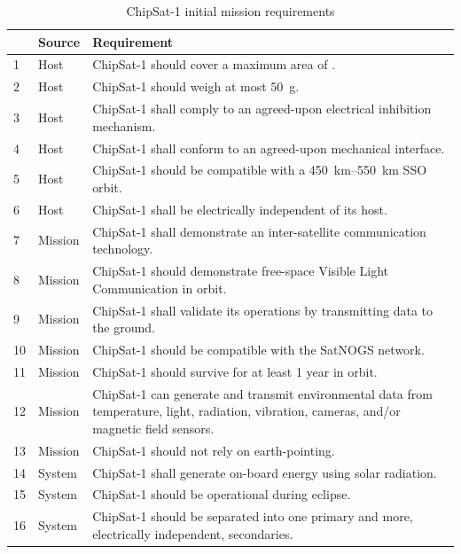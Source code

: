 \documentclass[a4paper,nobib,justified,final]{tufte-book}
\begin{document}
\begin{table}[]
	\begin{tabularx}{\linewidth}{@{}llX@{}}
		\toprule
		& Source  & Requirement                                                                            \\ \midrule
		1 & Host    & ChipSat-1 should cover a maximum area of \qtyproduct{5 x 5 x 1}{\centi\meter}.          \\
		2 & Host    & ChipSat-1 should weigh at most \qty{50}{\gram}.                                         \\
		3 & Host    & ChipSat-1 shall comply to an agreed-upon electrical inhibition mechanism.               \\
		4 & Host    & ChipSat-1 shall conform to an agreed-upon mechanical interface.                         \\
		5 & Host    & ChipSat-1 should be compatible with a \qtyrange{450}{550}{\kilo\meter} \acs{SSO} orbit. \\
		6 & Host    & ChipSat-1 shall be electrically independent of its host.                                \\
		7 & Mission & ChipSat-1 shall demonstrate an inter-satellite communication technology.            \\
		8 & Mission & ChipSat-1 should demonstrate free-space Visible Light Communication in orbit.				\\
		9 & Mission & ChipSat-1 shall validate its operations by transmitting data to the ground.             \\
		10 & Mission & ChipSat-1 should be compatible with the SatNOGS network.             \\
		11 & Mission & ChipSat-1 should survive for at least 1 year in orbit.             \\
		12 & Mission & ChipSat-1 can generate and transmit environmental data from temperature, light, radiation, vibration, cameras, and/or magnetic field sensors. \\
		13 & Mission & ChipSat-1 should not rely on earth-pointing. \\
		14 & System  & ChipSat-1 shall generate on-board energy using solar radiation.             \\
		15 & System & ChipSat-1 should be operational during eclipse.             \\
		16 & System & ChipSat-1 should be separated into one primary and more, electrically independent, secondaries. \\
		
		\bottomrule
	\end{tabularx}
	\caption{ChipSat-1 initial mission requirements}
\end{table}
\end{document}

